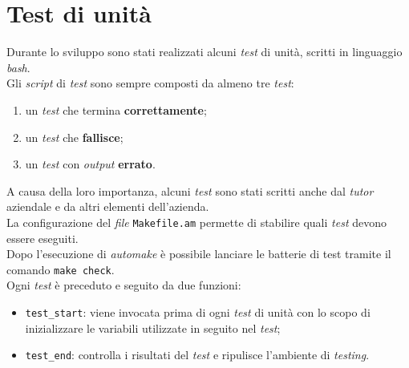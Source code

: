        













\section{Test di unità}
Durante lo sviluppo sono stati realizzati alcuni \textit{test} di unità, scritti
in linguaggio \textit{bash}. \\
Gli \textit{script} di \textit{test} sono sempre composti da almeno tre \textit{test}:
  \begin{enumerate}
    \item un \textit{test} che termina \textbf{correttamente};
    \item un \textit{test} che \textbf{fallisce};
    \item un \textit{test} con \textit{output} \textbf{errato}.
  \end{enumerate}
A causa della loro importanza, alcuni \textit{test} sono stati scritti anche dal \textit{tutor} 
aziendale e da altri elementi dell'azienda. \\
La configurazione del \textit{file} \texttt{Makefile.am} permette di stabilire quali \textit{test} devono essere
eseguiti. \\ Dopo l'esecuzione di \textit{automake} è possibile lanciare le batterie di test tramite il
comando \texttt{make check}. \\
Ogni \textit{test} è preceduto e seguito da due funzioni:
\begin{itemize}
  \item \texttt{test\_start}: viene invocata prima di ogni \textit{test} di unità
                              con lo scopo di inizializzare le variabili utilizzate
                              in seguito nel \textit{test};
  \item \texttt{test\_end}:   controlla i risultati del \textit{test} e ripulisce l'ambiente
                              di \textit{testing}.
\end{itemize}
